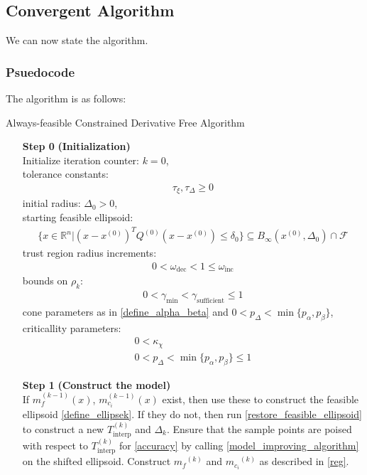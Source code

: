 \documentclass{article}
\theoremstyle{case}
\newcommand{\dk}{\Delta_k}
\newcommand{\feasible}{{\mathcal F}}
\newcommand{\gammabi}{\gamma_{\text{sufficient}}}
\newcommand{\gammasm}{\gamma_{\text{min}}}
\newcommand{\mcik}{{{m}_{c_i}}^{(k)}}
\newcommand{\mfk}{{{m}_f}^{(k)}}
\newcommand{\omegadec}{\omega_{\text{dec}}}
\newcommand{\omegainc}{\omega_{\text{inc}}}
\newcommand{\rk}{\rho_k}
\newcommand{\Rn}{\mathbb R^n}
\newcommand{\sampletrk}{{T_{\text{interp}}^{(k)}}}
\newcommand{\tolcrit}{\tau_{\xi}}
\newcommand{\tolrad}{\tau_{\Delta}}
\begin{document}
\subsection{Convergent Algorithm}

We can now state the algorithm.


\subsubsection{Psuedocode}
The algorithm is as follows:

\begin{algorithm}[H]
    \caption{Always-feasible Constrained Derivative Free Algorithm}
    \label{constrained_dfo}
    \begin{itemize}
        \item[\textbf{Step 0}] \textbf{(Initialization)} \\
        	Initialize iteration counter: $k=0$, \\
            tolerance constants: 
\begin{align}
            \tolcrit, \tolrad \ge 0 \label{define_algorithm_tolerances}
\end{align}
            initial radius: $\Delta_0 > 0$, \\
            starting feasible ellipsoid: \begin{align}
            \{x \in\Rn | (x - x^{(0)})^T Q^{(0)} (x - x^{(0)}) \le \delta_0 \} \subseteq B_{\infty}\left(x^{(0)}, \Delta_{0}\right) \cap \feasible
            \end{align}
            trust region radius increments:
\begin{align}
0 < \omegadec < 1 \le \omegainc		\label{define_the_omegas}
\end{align}
            bounds on $\rk$:
\begin{align}
0 < \gammasm < \gammabi \le 1	\label{define_the_gammas}
\end{align}
            cone parameters as in \cref{define_alpha_beta} and
            $0 < p_{\Delta} < \min\{p_{\alpha}, p_{\beta}\}$, \\
            criticallity parameters:
\begin{align}
0 < \kappa_{\chi} \label{define_kappa_chi} \\
0 < p_{\Delta} < \min\{p_{\alpha}, p_{\beta}\} \le 1 \label{define_p_delta} 
\end{align}
            
        \item[\textbf{Step 1}] \textbf{(Construct the model)} \\
	    If $m_{f}^{(k-1)}(x)$, $m_{c_i}^{(k-1)}(x)$ exist, then use these to construct the feasible ellipsoid \cref{define_ellipsek}.
	    If they do not, then run \cref{restore_feasible_ellipsoid} to construct a new $\sampletrk$ and $\dk$.
            Ensure that the sample points are poised with respect to $ \sampletrk $ for \cref{accuracy} by calling \cref{model_improving_algorithm} on the shifted ellipsoid.
            Construct $\mfk$ and $\mcik$ as described in \cref{reg}.
        

\end{itemize}
\end{algorithm}
\end{document}
